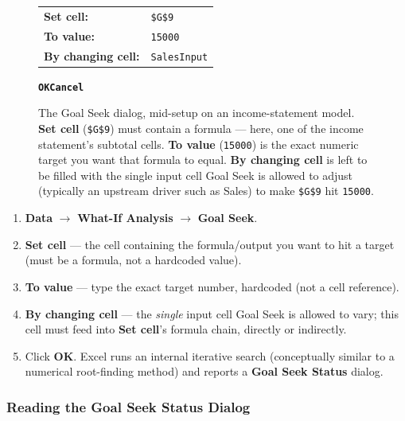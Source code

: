 \documentclass[11pt,a4paper]{article}
\newcommand{\key}[1]{\texttt{\colorbox{black!8}{\textbf{#1}}}}
\begin{document}
\begin{figure}[h]
\centering
\begin{tcolorbox}[width=0.72\linewidth,colback=black!2,colframe=rulegray,title={Goal Seek},coltitle=black,fonttitle=\bfseries,boxrule=0.6pt,arc=1pt]
\small
\begin{tabular}{@{}L{3.2cm}L{4.8cm}@{}}
\textbf{Set cell:} & \texttt{\$G\$9} \\
\textbf{To value:} & \texttt{15000} \\
\textbf{By changing cell:} & \texttt{SalesInput} \\
\end{tabular}
\hfill\key{OK}\quad\key{Cancel}
\end{tcolorbox}
\caption{The Goal Seek dialog, mid-setup on an income-statement model. \textbf{Set cell} (\texttt{\$G\$9}) must contain a formula --- here, one of the income statement's subtotal cells. \textbf{To value} (\texttt{15000}) is the exact numeric target you want that formula to equal. \textbf{By changing cell} is left to be filled with the single input cell Goal Seek is allowed to adjust (typically an upstream driver such as Sales) to make \texttt{\$G\$9} hit \texttt{15000}.}
\label{fig:goalseek}
\end{figure}

\begin{formulasyntax}
\begin{enumerate}
  \item \textbf{Data} $\rightarrow$ \textbf{What-If Analysis} $\rightarrow$ \textbf{Goal Seek}.
  \item \textbf{Set cell} --- the cell containing the formula/output you want to hit a target (must be a formula, not a hardcoded value).
  \item \textbf{To value} --- type the exact target number, hardcoded (not a cell reference).
  \item \textbf{By changing cell} --- the \emph{single} input cell Goal Seek is allowed to vary; this cell must feed into \textbf{Set cell}'s formula chain, directly or indirectly.
  \item Click \textbf{OK}. Excel runs an internal iterative search (conceptually similar to a numerical root-finding method) and reports a \textbf{Goal Seek Status} dialog.
\end{enumerate}
\end{formulasyntax}

\subsubsection{Reading the Goal Seek Status Dialog}
\end{document}
